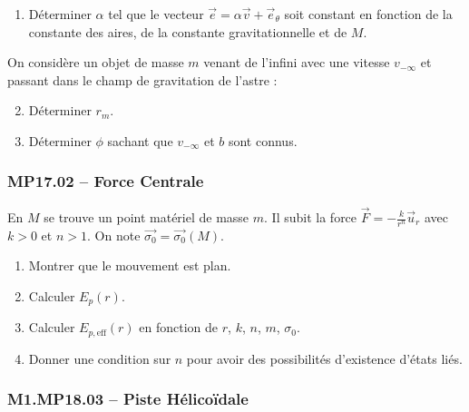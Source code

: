 \begin{enumerate}
    \item Déterminer $\alpha$ tel que le vecteur $\overrightarrow{e} = \alpha \overrightarrow{v} + \overrightarrow{e}_\theta$ soit constant en fonction de la constante des aires, de la constante gravitationnelle et de $M$.
\end{enumerate}

On considère un objet de masse $m$ venant de l'infini avec une vitesse $v_{-\infty}$ et passant dans le champ de gravitation de l'astre :
\begin{center}
\end{center}

\begin{enumerate}
    \setcounter{enumi}{1}
    \item Déterminer $r_m$.
    \item Déterminer $\phi$ sachant que $v_{-\infty}$ et $b$ sont connus.
\end{enumerate}

\subsubsection*{MP17.02 -- Force Centrale  \corrige}

En $M$ se trouve un point matériel de masse $m$. Il subit la force $\overrightarrow{F} = -\frac{k}{r^n} \overrightarrow{u}_r$ avec $k > 0$ et $n > 1$. On note $\overrightarrow{\sigma_0} = \overrightarrow{\sigma_0}(M)$.

\begin{enumerate}
    \item Montrer que le mouvement est plan.
    \item Calculer $E_p(r)$.
    \item Calculer $E_{p,\text{eff}}(r)$ en fonction de $r$, $k$, $n$, $m$, $\sigma_0$.
    \item Donner une condition sur $n$ pour avoir des possibilités d'existence d'états liés.
\end{enumerate}

\newpage
\subsubsection*{M1.MP18.03 -- Piste Hélicoïdale  \corrige}

